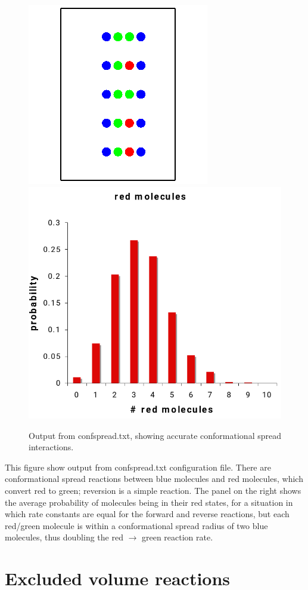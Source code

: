 \documentclass {scrbook}
\begin{document}
\begin{figure}[h]
\centering
\includegraphics[height=5 cm]{figures/image56.png}
\includegraphics[height=5 cm]{figures/image57.png}
\caption{Output from confspread.txt, showing accurate conformational spread interactions.}
\label{fig:confspread}
\end{figure}

This figure show output from confspread.txt configuration file. There are conformational spread reactions between blue molecules and red molecules, which convert red to green; reversion is a simple reaction. The panel on the right shows the average probability of molecules being in their red states, for a situation in which rate constants are equal for the forward and reverse reactions, but each red/green molecule is within a conformational spread radius of two blue molecules, thus doubling the red $\rightarrow$ green reaction rate.

\section{Excluded volume reactions}
\end{document}
